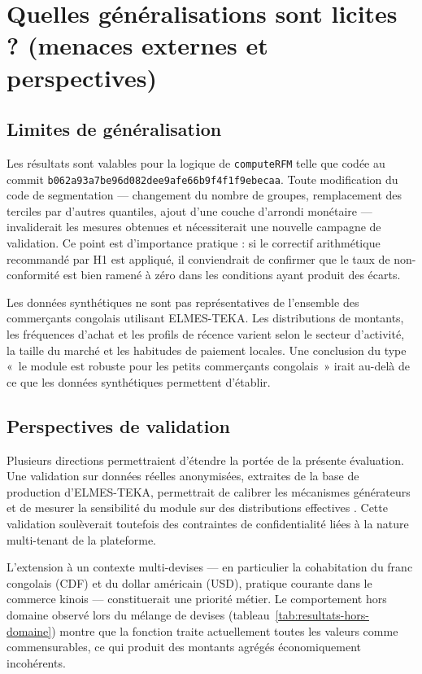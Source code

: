\section{Quelles généralisations sont licites ? (menaces externes et perspectives)}
\label{sec:disc-validite-externe}

\subsection{Limites de généralisation}
\label{subsec:disc-ve-limites}

Les résultats sont valables pour la logique de \texttt{computeRFM} telle que codée au commit
\texttt{b062a93a7be96d082dee9afe66b9f4f1f9ebecaa}. Toute modification du code de segmentation
— changement du nombre de groupes, remplacement des terciles par d'autres quantiles, ajout
d'une couche d'arrondi monétaire — invaliderait les mesures obtenues et nécessiterait une
nouvelle campagne de validation. Ce point est d'importance pratique : si le correctif
arithmétique recommandé par H1 est appliqué, il conviendrait de confirmer que le taux de
non-conformité est bien ramené à zéro dans les conditions ayant produit des écarts.

Les données synthétiques ne sont pas représentatives de l'ensemble des commerçants congolais
utilisant ELMES-TEKA. Les distributions de montants, les fréquences d'achat et les profils
de récence varient selon le secteur d'activité, la taille du marché et les habitudes de
paiement locales. Une conclusion du type «~le module est robuste pour les petits commerçants
congolais~» irait au-delà de ce que les données synthétiques permettent d'établir.

\subsection{Perspectives de validation}
\label{subsec:disc-ve-perspectives}

Plusieurs directions permettraient d'étendre la portée de la présente évaluation. Une
validation sur données réelles anonymisées, extraites de la base de production d'ELMES-TEKA,
permettrait de calibrer les mécanismes générateurs et de mesurer la sensibilité du module
sur des distributions effectives \citep{Salminen2023}. Cette validation soulèverait
toutefois des contraintes de confidentialité liées à la nature multi-tenant de la plateforme.

L'extension à un contexte multi-devises — en particulier la cohabitation du franc congolais
(CDF) et du dollar américain (USD), pratique courante dans le commerce kinois — constituerait
une priorité métier. Le comportement hors domaine observé lors du mélange de devises
(tableau~\ref{tab:resultats-hors-domaine}) montre que la fonction traite actuellement toutes
les valeurs comme commensurables, ce qui produit des montants agrégés économiquement
incohérents.

